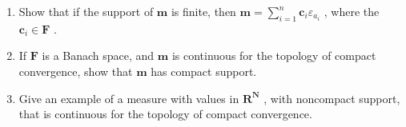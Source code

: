 \begin{enumerate}
\def\labelenumi{\alph{enumi})}
\item
  Show that if the support of \(\mathbf{m}\) is finite, then \(\mathbf{m} = \sum_{i=1}^{n} \mathbf{c}_i \varepsilon_{a_i}\) , where the \(\mathbf{c}_i \in \mathbf{F}\) .
\item
  If \(\mathbf{F}\) is a Banach space, and \(\mathbf{m}\) is continuous for the topology of compact convergence, show that \(\mathbf{m}\) has compact support.
\item
  Give an example of a measure with values in \(\mathbf{R}^{\mathbf{N}}\) , with noncompact support, that is continuous for the topology of compact convergence.
\end{enumerate}

\setcounter{exercisegroup}{3}
\edef\CurrentExerciseGroup{\arabic{exercisegroup}}
